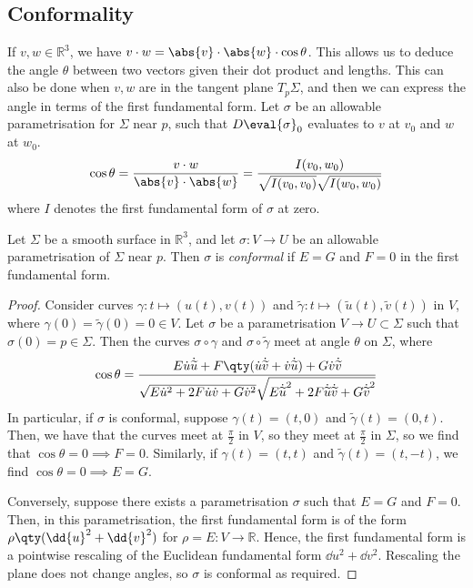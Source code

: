 \subsection{Conformality}
If $v,w \in \mathbb R^3$, we have $v \cdot w = \abs{v} \cdot \abs{w} \cdot \cos\theta$.
This allows us to deduce the angle $\theta$ between two vectors given their dot product and lengths.
This can also be done when $v,w$ are in the tangent plane $T_p \Sigma$, and then we can express the angle in terms of the first fundamental form.
Let $\sigma$ be an allowable parametrisation for $\Sigma$ near $p$, such that $D\eval{\sigma}_0$ evaluates to $v$ at $v_0$ and $w$ at $w_0$.
\begin{align*}
	\cos \theta = \frac{v \cdot w}{\abs{v} \cdot \abs{w}} = \frac{I(v_0, w_0)}{\sqrt{I(v_0,v_0)} \sqrt{I(w_0,w_0)}}
\end{align*}
where $I$ denotes the first fundamental form of $\sigma$ at zero.
\begin{lemma}
	Let $\Sigma$ be a smooth surface in $\mathbb R^3$, and let $\sigma \colon V \to U$ be an allowable parametrisation of $\Sigma$ near $p$.
	Then $\sigma$ is \textit{conformal} if $E = G$ and $F = 0$ in the first fundamental form.
\end{lemma}
\begin{proof}
	Consider curves $\gamma \colon t \mapsto (u(t), v(t))$ and $\widetilde \gamma \colon t \mapsto (\widetilde u(t), \widetilde v(t))$ in $V$, where $\gamma(0) = \widetilde \gamma(0) = 0 \in V$.
	Let $\sigma$ be a parametrisation $V \to U \subset \Sigma$ such that $\sigma(0) = p \in \Sigma$.
	Then the curves $\sigma \circ \gamma$ and $\sigma \circ \widetilde \gamma$ meet at angle $\theta$ on $\Sigma$, where
	\begin{align*}
		\cos \theta = \frac{E \dot u \dot {\widetilde u} + F \qty(\dot u \dot{\widetilde v} + \dot v \dot{\widetilde u}) + G \dot v \dot{\widetilde v}}{\sqrt{E \dot u^2 + 2F \dot u \dot v + G \dot v^2} \sqrt{E \dot{\widetilde u}^2 + 2F \dot{\widetilde u} \dot {\widetilde v} + G \dot{\widetilde v}^2}}
	\end{align*}
	In particular, if $\sigma$ is conformal, suppose $\gamma(t) = (t,0)$ and $\widetilde \gamma(t) = (0,t)$.
	Then, we have that the curves meet at $\frac{\pi}{2}$ in $V$, so they meet at $\frac{\pi}{2}$ in $\Sigma$, so we find that $\cos \theta = 0 \implies F = 0$.
	Similarly, if $\gamma(t) = (t,t)$ and $\widetilde \gamma(t) = (t,-t)$, we find $\cos \theta = 0 \implies E = G$.

	Conversely, suppose there exists a parametrisation $\sigma$ such that $E = G$ and $F = 0$.
	Then, in this parametrisation, the first fundamental form is of the form $\rho \qty(\dd{u}^2 + \dd{v}^2)$ for $\rho = E \colon V \to \mathbb R$.
	Hence, the first fundamental form is a pointwise rescaling of the Euclidean fundamental form $\dd{u}^2 + \dd{v}^2$.
	Rescaling the plane does not change angles, so $\sigma$ is conformal as required.
\end{proof}
